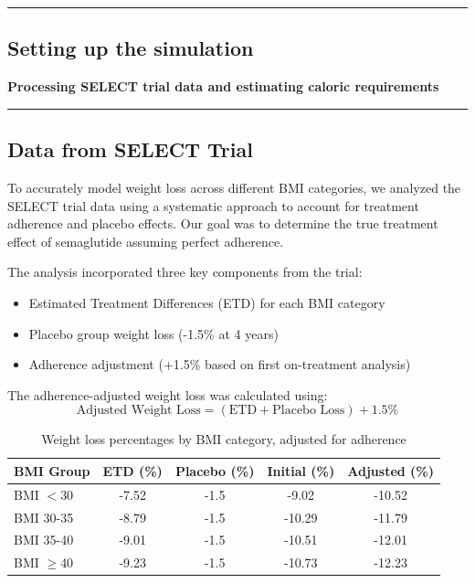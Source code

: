 {\color{gray}\hrule}
\begin{center}
\section{Setting up the simulation}
\textbf{Processing SELECT trial data and estimating caloric requirements}
\bigskip
\end{center}
{\color{gray}\hrule}

\subsection{Data from SELECT Trial}
To accurately model weight loss across different BMI categories, we analyzed the SELECT trial data \cite{Ryan2024} using a systematic approach to account for treatment adherence and placebo effects. Our goal was to determine the true treatment effect of semaglutide assuming perfect adherence.

The analysis incorporated three key components from the trial:
\begin{itemize}
    \item Estimated Treatment Differences (ETD) for each BMI category
    \item Placebo group weight loss (-1.5\% at 4 years)
    \item Adherence adjustment (+1.5\% based on first on-treatment analysis)
\end{itemize}

The adherence-adjusted weight loss was calculated using:
\begin{equation}
    \text{Adjusted Weight Loss} = (\text{ETD} + \text{Placebo Loss}) + 1.5\%
\end{equation}

\begin{table}[h]
\centering
\begin{tabular}{|l|c|c|c|c|}
\hline
\textbf{BMI Group} & \textbf{ETD (\%)} & \textbf{Placebo (\%)} & \textbf{Initial (\%)} & \textbf{Adjusted (\%)} \\
\hline
BMI $<$30 & -7.52 & -1.5 & -9.02 & -10.52 \\
BMI 30-35 & -8.79 & -1.5 & -10.29 & -11.79 \\
BMI 35-40 & -9.01 & -1.5 & -10.51 & -12.01 \\
BMI $\geq$40 & -9.23 & -1.5 & -10.73 & -12.23 \\
\hline
\end{tabular}
\caption{Weight loss percentages by BMI category, adjusted for adherence}
\end{table}

